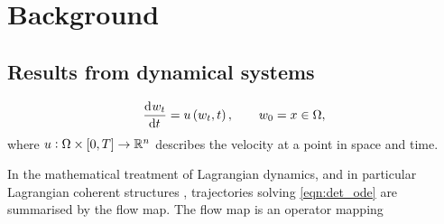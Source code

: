 
\chapter{Background}










\section{Results from dynamical systems}

\begin{equation}
	\dod{w_t}{t} = u\left(w_t, t\right), \qquad w_0 = x \in \Omega,
	\label{eqn:det_ode}
\end{equation}
where \(u: \Omega \times[0,T] \to \mathbb{R}^n\) describes the velocity at a point in space and time.

In the mathematical treatment of Lagrangian dynamics, and in particular Lagrangian coherent structures \citep{BalasuriyaEtAl_2018_GeneralizedLagrangianCoherent}, trajectories solving \eqref{eqn:det_ode} are summarised by the flow map.
The flow map is an operator mapping

